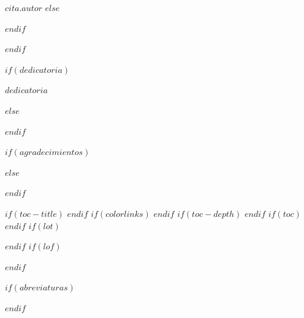 \hfill {$cita.autor$}
$else$

$endif$

$endif$
\newpage


$if(dedicatoria)$

\thispagestyle{empty}

\vspace*{0.3\textheight}
\begin{center}
{$dedicatoria$}
\end{center}
$else$


$endif$
\newpage


$if(agradecimientos)$
\thispagestyle{empty}



$else$


$endif$
\newpage


\begingroup
\thispagestyle{empty}
$if(toc-title)$
\renewcommand*\contentsname{$toc-title$}
$endif$
$if(colorlinks)$
\hypersetup{linkcolor=$if(toccolor)$$toccolor$$else$$endif$}
$endif$
$if(toc-depth)$
\setcounter{tocdepth}{$toc-depth$}
$endif$
$if(toc)$
\tableofcontents
$endif$
$if(lot)$
\listoftables
$endif$
$if(lof)$
\listoffigures
$endif$
\endgroup


$if(abreviaturas)$
\thispagestyle{empty}


\noindent

$endif$
